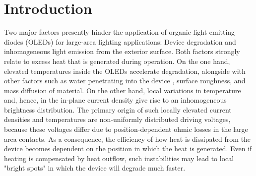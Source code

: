 \documentclass[%
9pt,
 aip,
rsi,%
 amsmath,amssymb,
preprint,%
]{revtex4-1}
\newcommand{\thermalconductivity}{$\mathrm{W m^{-1} K^{-1}}$}
\newcommand{\hcoefficient}{$\mathrm{W m^{-2} K^{-1}}$}
\begin{document}
\maketitle



\section{Introduction}
Two major factors presently hinder the application of organic light emitting diodes (OLEDs) for large-area lighting applications: Device degradation and inhomogeneous light emission from the exterior surface.\cite{Park2011}
Both factors strongly relate to excess heat that is generated during operation.
On the one hand, elevated temperatures inside the OLEDs accelerate degradation,\cite{Xu2004,Zhou2000,Nenna2007} alongside with other factors such as water penetrating into the device \cite{Li2016}, surface roughness, and mass diffusion of material.
On the other hand, local variations in temperature and, hence, in the in-plane current density give rise to an inhomogeneous brightness distribution.\cite{Garditz2007,Kohari2013} 
The primary origin of such locally elevated current densities and temperatures are non-uniformly distributed driving voltages, because these voltages differ due to position-dependent ohmic losses in the large area contacts.\cite{Fischer2014} 
As a consequence, the efficiency of how heat is dissipated from the device becomes dependent on the position in which the heat is generated. 
Even if heating is compensated by heat outflow,\cite{Park2014} such instabilities may lead to local "bright spots" in which the device will degrade much faster.
\end{document}

